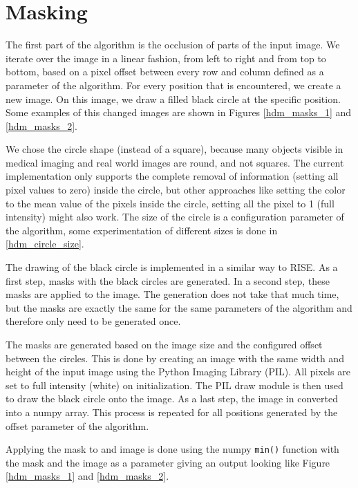 \section{Masking}

The first part of the algorithm is the occlusion of parts of the input image.
We iterate over the image in a linear fashion, from left to right and from top to bottom, based on a pixel offset between every row and column defined as a parameter of the algorithm.
For every position that is encountered, we create a new image. On this image, we draw a filled black circle at the specific position.
Some examples of this changed images are shown in Figures \ref{hdm_masks_1} and \ref{hdm_masks_2}.

We chose the circle shape (instead of a square), because many objects visible in medical imaging and real world images are round, and not squares.
The current implementation only supports the complete removal of information (setting all pixel values to zero) inside the circle, but other approaches like
setting the color to the mean value of the pixels inside the circle, setting all the pixel to 1 (full intensity) might also work.
The size of the circle is a configuration parameter of the algorithm, some experimentation of different sizes is done in \autoref{hdm_circle_size}.

The drawing of the black circle is implemented in a similar way to RISE. As a first step, masks with the black circles are generated. In a second step,
these masks are applied to the image. The generation does not take that much time, but the masks are exactly the same for the same parameters of the algorithm and therefore
only need to be generated once.

The masks are generated based on the image size and the configured offset between the circles.
This is done by creating an image with the same width and height of the input image using the Python Imaging Library (PIL). All pixels are set to full intensity (white) on initialization.
The PIL draw module is then used to draw the black circle onto the image. As a last step, the image in converted into a numpy array. This process is repeated for all positions generated
by the offset parameter of the algorithm.

Applying the mask to and image is done using the numpy \texttt{min()} function with the mask and the image as a parameter giving an output looking like Figure \ref{hdm_masks_1} and \ref{hdm_masks_2}.

